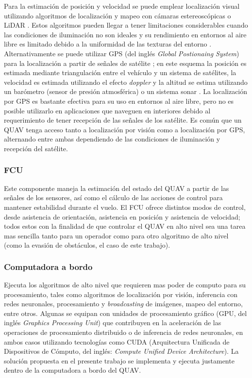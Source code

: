 Para la estimación de posición y velocidad se puede emplear localización visual utilizando algoritmos de localización y mapeo con cámaras estereoscópicas o LiDAR \cite{multidrone2017review}. Estos algoritmos pueden llegar a tener limitaciones considerables cuando las condiciones de iluminación no son ideales y su rendimiento en entornos al aire libre es limitado debido a la uniformidad de las texturas del entorno \cite{multidrone2017review}. Alternativamente se puede utilizar GPS (del inglés \textit{Global Postionaing System}) para la localización a partir de señales de satélite \cite{multidrone2017review}; en este esquema la posición es estimada mediante triangulación entre el vehículo y un sistema de satélites, la velocidad es estimada utilizando el efecto \textit{doppler} y la altitud se estima utilizando un barómetro (sensor de presión atmosférica) o un sistema sonar \cite{multidrone2017review}. La localización por GPS es bastante efectiva para su uso en entornos al aire libre, pero no es posible utilizarlo en aplicaciones que naveguen en interiores debido al requerimiento de tener recepción de las señales de los satélite. Es común que un QUAV tenga acceso tanto a localización por visión como a localización por GPS, alternando entre ambas dependiendo de las condiciones de iluminación y recepción del satélite.

\subsubsection{FCU}
\label{sec:QUAV-FCU}

Este componente maneja la estimación del estado del QUAV a partir de las señales de los sensores, así como el cálculo de las acciones de control para mantener estabilidad durante el vuelo. El FCU ofrece distintos modos de control, desde asistencia de orientación, asistencia en posición y asistencia de velocidad; todos estos con la finalidad de que controlar el QUAV en alto nivel sea una tarea mas sencilla tanto para un operador como para otro algoritmo de alto nivel (como la evasión de obstáculos, el caso de este trabajo). 

\subsubsection{Computadora a bordo}

Ejecuta los algoritmos de alto nivel que requieren mas poder de computo para su procesamiento, tales como algoritmos de localización por visión, inferencia con redes neuronales, procesamiento y \textit{broadcasting} de imágenes, mapeo del entorno, entre otros. Algunas se equipan con unidades de procesamiento gráfico (GPU, del inglés \textit{Graphics Processing Unit}) que contribuyen en la aceleración de las operaciones de procesamiento distribuido o de inferencia de redes neuronales, en ambos casos utilizando tecnologías como CUDA (Arquitectura Unificada de Dispositivos de Cómputo, del inglés: \textit{Compute Unified Device Architecture}). La solución propuesta en el presente trabajo se implementa y ejecuta justamente dentro de la computadora a bordo del QUAV.

